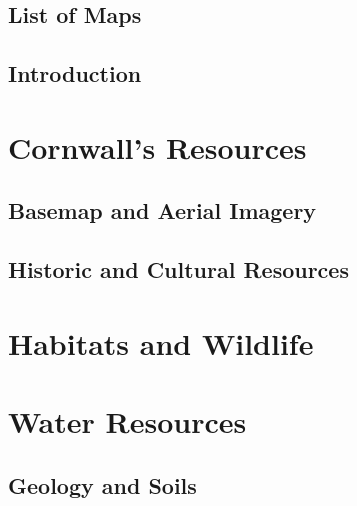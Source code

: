 \documentclass[11pt,fleqn, openany]{book} %
\begin{document}
\chapter{List of Maps}\label{sec:listofmaps}


\pagebreak


\mainmatter
\chapter{Introduction}\label{sec:intro}


\pagebreak

\part{Cornwall's Resources}

\chapter{Basemap and Aerial Imagery}\label{sec:basemap}


\chapter{Historic and Cultural Resources}\label{sec:historic}


\part{Habitats and Wildlife}\label{sec:habitats}


\part{Water Resources}\label{sec:water}


\chapter{Geology and Soils}\label{sec:geology}

\end{document}
